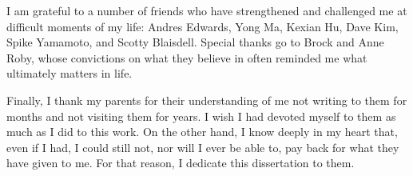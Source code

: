 {I am grateful to a number of friends who have strengthened and challenged
me at difficult moments of my life: Andres Edwards, Yong Ma, Kexian Hu,
Dave Kim, Spike Yamamoto, and Scotty Blaisdell. Special thanks go to Brock
and Anne Roby, whose convictions on what they believe in often reminded me
what ultimately matters in life.

Finally, I thank my parents for their understanding of me not writing to
them for months and not visiting them for years. I wish I had devoted
myself to them as much as I did to this work. On the other hand, I know
deeply in my heart that, even if I had, I could still not, nor will I ever
be able to, pay back for what they have given to me. For that reason, I
dedicate this dissertation to them.

}



